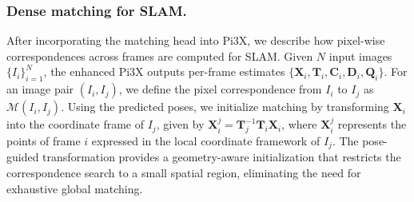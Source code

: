 
\subsubsection{Dense matching for SLAM.} After incorporating the matching head into Pi3X, we describe how pixel-wise correspondences across frames are computed for SLAM. Given $N$ input images $\{I_i\}_{i=1}^{N}$, the enhanced Pi3X outputs per-frame estimates $\{\mathbf{X}_i, \mathbf{T}_i, \mathbf{C}_i, \mathbf{D}_i, \mathbf{Q}_i\}$. For an image pair $(I_i, I_j)$, we define the pixel correspondence from $I_i$ to $I_j$ as $\mathcal{M}(I_i, I_j)$. 
Using the predicted poses, we initialize matching by transforming $\mathbf{X}_i$ into the coordinate frame of $I_j$, given by
$
\mathbf{X}_i^j = \mathbf{T}_j^{-1} \mathbf{T}_i \mathbf{X}_i
$,
where $\mathbf{X}_i^j$ represents the points of frame $i$ expressed in the local coordinate framework of $I_j$. The pose-guided transformation provides a geometry-aware initialization that restricts the correspondence search to a small spatial region, eliminating the need for exhaustive global matching. 

